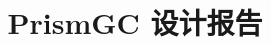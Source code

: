 \documentclass{xDocument}
\begin{document}
\title{PrismGC 设计报告}



\pagestyle{fancy}


\clearpage

\tableofcontents
\clearpage


\clearpage

\clearpage

\clearpage

\end{document}
